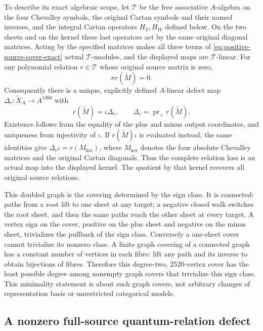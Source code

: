 To describe its exact algebraic scope, let $\mathcal T$ be the free
associative $A$-algebra on the four Chevalley symbols, the original
Cartan symbols and their named inverses, and the integral Cartan
operators $H_V,H_W$ defined below. On the two sheets and on the
kernel these last operators act by the same original diagonal
matrices. Acting by the specified
matrices makes all three terms of
\eqref{eq:positive-source-cover-exact} actual $\mathcal T$-modules,
and the displayed maps are $\mathcal T$-linear. For any polynomial
relation $r\in\mathcal T$ whose original source matrix is zero,
\[
 \pi r(\widetilde M)=0.
\]
Consequently there is a unique, explicitly defined $A$-linear defect
map $\Delta_r:\widetilde X_A\to A^{1260}$ with
\begin{equation}\label{eq:positive-source-relation-defect}
 r(\widetilde M)=\iota\Delta_r,
 \qquad \Delta_r=\operatorname{pr}_+r(\widetilde M).
\end{equation}
Existence follows from the equality of the plus and minus output
coordinates, and uniqueness from injectivity of $\iota$. If
$r(\widetilde M)\iota$ is evaluated instead, the same identities give
$\Delta_r\iota=r(M_{\ker})$, where $M_{\ker}$ denotes the four
absolute Chevalley matrices and the original Cartan diagonals.
Thus the complete relation loss is an actual
map into the displayed kernel. The quotient by that kernel recovers
all original source relations.

This doubled graph is the covering determined by the sign class.
It is connected: paths from a root lift to one sheet at any target;
a negative closed walk switches the root sheet, and then the same
paths reach the other sheet at every target. A vertex sign on the
cover, positive on the plus sheet and negative on the minus sheet,
trivializes the pullback of the sign class. Conversely a one-sheet
cover cannot trivialize its nonzero class. A finite graph covering
of a connected graph has a constant number of vertices in each
fibre: lift any path and its inverse to obtain bijections of fibres.
Therefore this degree-two, $2520$-vertex cover has the least possible
degree among nonempty graph covers that trivialize this sign class. This
minimality statement is about such graph covers, not arbitrary
changes of representation basis or unrestricted categorical models.

\subsection{A nonzero full-source quantum-relation defect}

